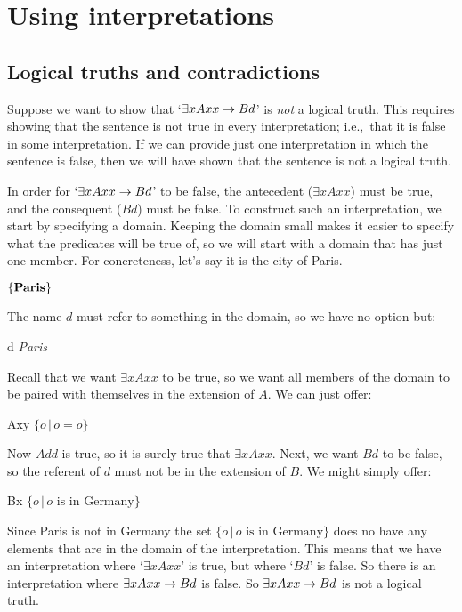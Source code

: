 \chapter{Using interpretations}
\label{sec.UsingModels}

\section{Logical truths and contradictions}
Suppose we want to show that `$\exists xAxx \eif Bd$' is \emph{not} a logical truth. This requires showing that the sentence is not true in every interpretation; i.e.,\ that it is false in some interpretation. If we can provide just one interpretation in which the sentence is false, then we will have shown that the sentence is not a logical truth.

In order for `$\exists xAxx \eif Bd$' to be false, the antecedent ($\exists x Axx$) must be true, and the consequent ($Bd$) must be false. To construct such an interpretation, we start by specifying a domain. Keeping the domain small makes it easier to specify what the predicates will be true of, so we will start with a domain that has just one member. For concreteness, let's say it is the city of Paris.
	\begin{ekey}
		\item[\text{domain}] $\{\emph{Paris}\}$
	\end{ekey}
The name $d$ must refer to something in the domain, so we have no option but:
	\begin{ekey}
		\item[d] \emph{Paris}
	\end{ekey}
Recall that we want $\exists x Axx$ to be true, so we want all members of the domain to be paired with themselves in the extension of $A$. We can just offer:
	\begin{ekey}
		\item[Axy] $\{o\,|\, o=o\}$
	\end{ekey}
Now $Add$ is true, so it is surely true that $\exists x Axx$. Next, we want $Bd$ to be false, so the referent of $d$ must not be in the extension of $B$. We might simply offer:
	\begin{ekey}
		\item[Bx] $\{o\,|\,\text{$o$ is in Germany}\}$
	\end{ekey}
Since Paris is not in Germany the set $\{o\,|\,\text{$o$ is in Germany}\}$ does no have any elements that are in the domain of the interpretation. This means that we have an interpretation where `$\exists x Axx$' is true, but where `$Bd$' is false. So there is an interpretation where $\exists x Axx \eif Bd$ is false. So $\exists x Axx \eif Bd$ is not a logical truth.

